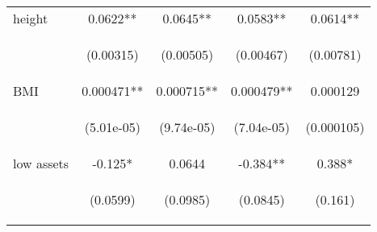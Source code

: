 \documentclass{article}[11pt,subeqn]
\begin{document}
\begin{spacing}{1.5}
\begin{table}[htpb!]
\begin{center}
\begin{tabular}{lcccc}
height & 0.0622** & 0.0645** & 0.0583** & 0.0614** \\
\vspace{4pt} & \begin{footnotesize}(0.00315)\end{footnotesize} & \begin{footnotesize}(0.00505)\end{footnotesize} & \begin{footnotesize}(0.00467)\end{footnotesize} & \begin{footnotesize}(0.00781)\end{footnotesize} \\
BMI & 0.000471** & 0.000715** & 0.000479** & 0.000129 \\
\vspace{4pt} & \begin{footnotesize}(5.01e-05)\end{footnotesize} & \begin{footnotesize}(9.74e-05)\end{footnotesize} & \begin{footnotesize}(7.04e-05)\end{footnotesize} & \begin{footnotesize}(0.000105)\end{footnotesize} \\
low assets & -0.125* & 0.0644 & -0.384** & 0.388* \\
\vspace{4pt} & \begin{footnotesize}(0.0599)\end{footnotesize} & \begin{footnotesize}(0.0985)\end{footnotesize} & \begin{footnotesize}(0.0845)\end{footnotesize} & \begin{footnotesize}(0.161)\end{footnotesize} \\

\end{tabular}
\end{center}
\end{table}
\end{spacing}
\end{document}
